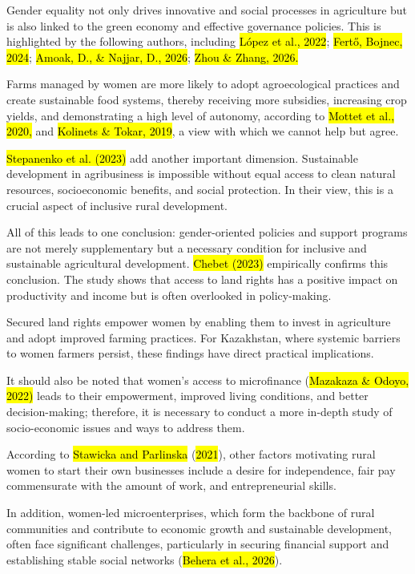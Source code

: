 \documentclass[
]{article}
\begin{document}
Gender equality not only drives innovative and social processes in
agriculture but is also linked to the green economy and effective
governance policies. This is highlighted by the following authors,
including \hl{López et al., 2022}; \hl{Fertő, Bojnec, 2024}; \hl{Amoak,
D., \& Najjar, D., 2026}; \hl{Zhou \& Zhang, 2026.}

Farms managed by women are more likely to adopt agroecological practices
and create sustainable food systems, thereby receiving more subsidies,
increasing crop yields, and demonstrating a high level of autonomy,
according to \hl{Mottet et al., 2020,} and \hl{Kolinets \& Tokar, 2019},
a view with which we cannot help but agree.

\hl{Stepanenko et al. (2023)} add another important dimension.
Sustainable development in agribusiness is impossible without equal
access to clean natural resources, socioeconomic benefits, and social
protection. In their view, this is a crucial aspect of inclusive rural
development.

All of this leads to one conclusion: gender-oriented policies and
support programs are not merely supplementary but a necessary condition
for inclusive and sustainable agricultural development. \hl{Chebet
(2023)} empirically confirms this conclusion. The study shows that
access to land rights has a positive impact on productivity and income
but is often overlooked in policy-making.

Secured land rights empower women by enabling them to invest in
agriculture and adopt improved farming practices. For Kazakhstan, where
systemic barriers to women farmers persist, these findings have direct
practical implications.

It should also be noted that women's access to microfinance
(\hl{Mazakaza \& Odoyo, 2022)} leads to their empowerment, improved
living conditions, and better decision-making; therefore, it is
necessary to conduct a more in-depth study of socio-economic issues and
ways to address them.

According to \hl{Stawicka and Parlinska} (\hl{2021}), other factors
motivating rural women to start their own businesses include a desire
for independence, fair pay commensurate with the amount of work, and
entrepreneurial skills.

In addition, women-led microenterprises, which form the backbone of
rural communities and contribute to economic growth and sustainable
development, often face significant challenges, particularly in securing
financial support and establishing stable social networks (\hl{Behera et
al., 2026}).
\end{document}
